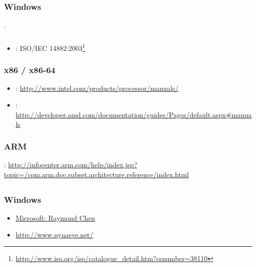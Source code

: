 ﻿\chapter{}

\section{}

\subsection{Windows}

\cite{Russinovich}.

\subsection{\CCpp}

\begin{itemize}
\item
{}: ISO/IEC 14882:2003\footnote{\url{http://www.iso.org/iso/catalogue_detail.htm?csnumber=38110}}
\end{itemize}

\subsection{x86 / x86-64}

\begin{itemize}
\item
{}: \url{http://www.intel.com/products/processor/manuals/}
\item
{}: \url{http://developer.amd.com/documentation/guides/Pages/default.aspx#manuals}
\end{itemize}

\subsection{ARM}

: \url{http://infocenter.arm.com/help/index.jsp?topic=/com.arm.doc.subset.architecture.reference/index.html}

\section{}

\subsection{Windows}

\begin{itemize}
\item
\href{http://blogs.msdn.com/oldnewthing/}{Microsoft: Raymond Chen}
\item
\url{http://www.nynaeve.net/}
\end{itemize}

